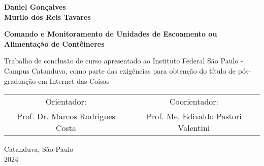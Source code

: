 \newpage
\thispagestyle{empty}
        \begin{center}
            \Large \textbf{Daniel Gonçalves}\\
            \Large \textbf{Murilo dos Reis Tavares}

            \vspace{3 cm}
            \Large \textbf{Comando e Monitoramento de Unidades de Escoamento ou Alimentação de Contêineres}
            
        \end{center}

        \vspace{3 cm}
        \hfill \parbox {8 cm} {Trabalho de conclusão de curso apresentado ao
        Instituto Federal São Paulo - Campus Catanduva, como parte das exigências para obtenção do título de pós-graduação em Internet das Coisas}
        \vspace{4 cm}

        \begin{table}[htb!]
            \centering
            \begin{tabular}{c|c}
                 Orientador: &
                 Coorientador: \\
                 Prof. Dr. Marcos Rodrigues Costa & 
                 Prof. Me. Edivaldo Pastori Valentini
            \end{tabular}
        \end{table}

        \begin{center}
            \vspace{5 cm}
            Catanduva, São Paulo \\
            2024
        \end{center}      
